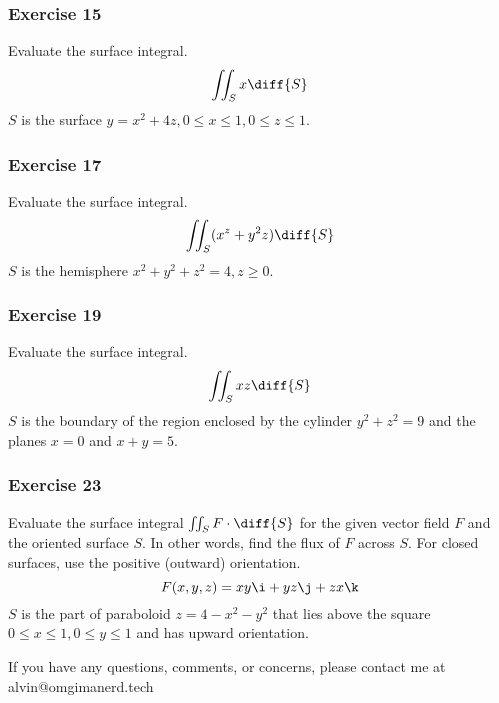 \documentclass{math}
\begin{document}
\subsubsection*{Exercise 15}
Evaluate the surface integral.
\[ \iint_{S}x\diff{S} \]
\( S \) is the surface \( y = x^2+4z,0\le x\le1,0\le z\le 1 \).

\subsubsection*{Exercise 17}
Evaluate the surface integral.
\[ \iint_{S}(x^z+y^2z)\diff{S} \]
\( S \) is the hemisphere \( x^2+y^2+z^2 = 4, z\ge0 \).

\subsubsection*{Exercise 19}
Evaluate the surface integral.
\[ \iint_{S}xz\diff{S} \]
\( S \) is the boundary of the region enclosed by the cylinder \( y^2+z^2 = 9 \)
and the planes \( x = 0 \) and \( x+y = 5 \).

\subsubsection*{Exercise 23}
Evaluate the surface integral \( \iint_{S}F\cdot\diff{S} \) for the given vector
field \( F \) and the oriented surface \( S \). In other words, find the flux of
\( F \) across \( S \). For closed surfaces, use the positive (outward)
orientation.
\[ F(x,y,z) = xy\i+yz\j+zx\k \]
\( S \) is the part of paraboloid \( z = 4-x^2-y^2 \) that lies above the square
\( 0\le x\le1,0\le y\le1 \) and has upward orientation.

\begin{center}
  If you have any questions, comments, or concerns, please contact me at
  alvin@omgimanerd.tech
\end{center}
\end{document}
